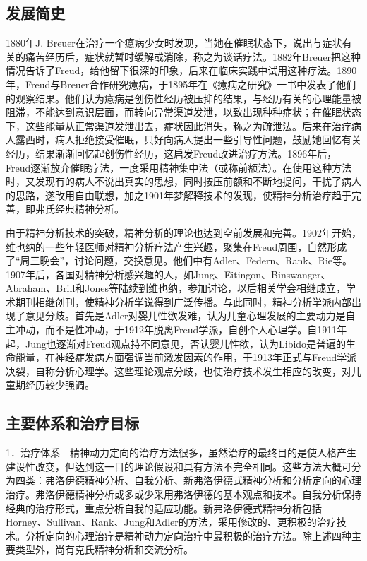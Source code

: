 \subsection{发展简史}

1880年J.
Breuer在治疗一个癔病少女时发现，当她在催眠状态下，说出与症状有关的痛苦经历后，症状就暂时缓解或消除，称之为谈话疗法。1882年Breuer把这种情况告诉了Freud，给他留下很深的印象，后来在临床实践中试用这种疗法。1890年，Freud与Breuer合作研究癔病，于1895年在《癔病之研究》一书中发表了他们的观察结果。他们认为癔病是创伤性经历被压抑的结果，与经历有关的心理能量被阻滞，不能达到意识层面，而转向异常渠道发泄，以致出现种种症状；在催眠状态下，这些能量从正常渠道发泄出去，症状因此消失，称之为疏泄法。后来在治疗病人露西时，病人拒绝接受催眠，只好向病人提出一些引导性问题，鼓励她回忆有关经历，结果渐渐回忆起创伤性经历，这启发Freud改进治疗方法。1896年后，Freud逐渐放弃催眠疗法，一度采用精神集中法（或称前额法）。在使用这种方法时，又发现有的病人不说出真实的思想，同时按压前额和不断地提问，干扰了病人的思路，遂改用自由联想，加之1901年梦解释技术的发现，使精神分析治疗趋于完善，即弗氏经典精神分析。

由于精神分析技术的突破，精神分析的理论也达到空前发展和完善。1902年开始，维也纳的一些年轻医师对精神分析疗法产生兴趣，聚集在Freud周围，自然形成了“周三晚会”，讨论问题，交换意见。他们中有Adler、Federn、Rank、Rie等。1907年后，各国对精神分析感兴趣的人，如Jung、Eitingon、Binswanger、Abraham、Brill和Jones等陆续到维也纳，参加讨论，以后相关学会相继成立，学术期刊相继创刊，使精神分析学说得到广泛传播。与此同时，精神分析学派内部出现了意见分歧。首先是Adler对婴儿性欲发难，认为儿童心理发展的主要动力是自主冲动，而不是性冲动，于1912年脱离Freud学派，自创个人心理学。自1911年起，Jung也逐渐对Freud观点持不同意见，否认婴儿性欲，认为Libido是普遍的生命能量，在神经症发病方面强调当前激发因素的作用，于1913年正式与Freud学派决裂，自称分析心理学。这些理论观点分歧，也使治疗技术发生相应的改变，对儿童期经历较少强调。

\subsection{主要体系和治疗目标}

1．治疗体系　精神动力定向的治疗方法很多，虽然治疗的最终目的是使人格产生建设性改变，但达到这一目的理论假设和具有方法不完全相同。这些方法大概可分为四类：弗洛伊德精神分析、自我分析、新弗洛伊德式精神分析和分析定向的心理治疗。弗洛伊德精神分析或多或少采用弗洛伊德的基本观点和技术。自我分析保持经典的治疗形式，重点分析自我的适应功能。新弗洛伊德式精神分析包括Horney、Sullivan、Rank、Jung和Adler的方法，采用修改的、更积极的治疗技术。分析定向的心理治疗是精神动力定向治疗中最积极的治疗方法。除上述四种主要类型外，尚有克氏精神分析和交流分析。

